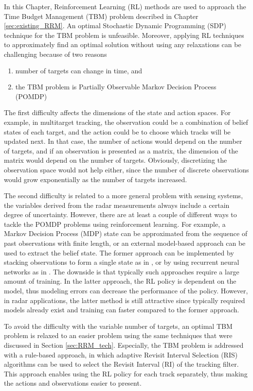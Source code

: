 \documentclass[english, 12pt, a4paper, elec, utf8, a-1b, online]{aaltothesis}
\begin{document}
In this Chapter, Reinforcement Learning (RL) methods are used to approach the Time Budget Management (TBM) problem described in Chapter \ref{sec:existing_RRM}.
An optimal Stochastic Dynamic Programming (SDP) technique for the TBM problem is unfeasible. 
Moreover, applying RL techniques to approximately find an optimal solution without using any relaxations can be challenging because of two reasons
\begin{enumerate}
    \item number of targets can change in time, and
    \item the TBM problem is Partially Observable Markov Decision Process (POMDP)
\end{enumerate}
The first difficulty affects the dimensions of the state and action spaces. 
For example, in multitarget tracking, the observation could be a combination of belief states of each target, and the action could be to choose which tracks will be updated next.
In that case, the number of actions would depend on the number of targets, and if an observation is presented as a matrix, the dimension of the matrix would depend on the number of targets.
Obviously, discretizing the observation space would not help either, since the number of discrete observations would grow exponentially as the number of targets increased.

The second difficulty is related to a more general problem with sensing systems,
the variables derived from the radar measurements always include a certain degree of uncertainty.
However, there are at least a couple of different ways to tackle the POMDP problems using reinforcement learning.
For example, a Markov Decision Process (MDP) state can be approximated from the sequence of past observations with finite length, or an external model-based approach can be used to extract the belief state.
The former approach can be implemented by stacking observations to form a single state as in \cite{Mnih2013}, or by using recurrent neural networks as in \cite{Hausknecht2015}.
The downside is that typically such approaches require a large amount of training.
In the latter approach, the RL policy is dependent on the model, thus modeling errors can decrease the performance of the policy.
However, in radar applications, the latter method is still attractive since typically required models already exist and training can faster compared to the former approach.

To avoid the difficulty with the variable number of targets, an optimal TBM problem is relaxed to an easier problem using the same techniques that were discussed in Section \ref{sec:RRM_tech}.
Especially, the TBM problem is addressed with a rule-based approach, in which adaptive Revisit Interval Selection (RIS) algorithms can be used to select the Revisit Interval (RI) of the tracking filter.
This approach enables using the RL policy for each track separately, thus making the actions and observations easier to present.
\end{document}
